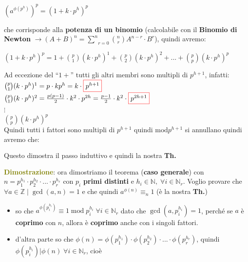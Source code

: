 \begin{flushleft}
\begin{boxA}
        {\centering
            $(a^{\phi(p^h)})^p = (1 + k \cdot p^h)^p$
        \par}
        che corrisponde alla \textbf{potenza di un binomio} (calcolabile con il \textbf{Binomio di Newton} $\rightarrow (A + B)^n = \underset{r=0}{\overset{n}{\sum}} \binom{n}{r} A^{n - r} \cdot B^r$), quindi avremo:

        {\centering
            $(1 + k \cdot p^h)^p = 1 + \binom{p}{1}(k \cdot p^h)^1 + \binom{p}{2}(k \cdot p^h)^2 + ... + \binom{p}{p}(k \cdot p^h)^p$
        \par}
        Ad eccezione del ``$1 +$'' tutti gli altri membri sono multipli di $p^{h + 1}$, infatti: \\
        $\binom{p}{1} (k \cdot p^h)^1 = p \cdot kp^h = k \cdot \fcolorbox{red}{white}{$p^{h + 1}$}$ \\
        $\binom{p}{1} (k \cdot p^h)^2 = \frac{p(p - 1)}{2} \cdot k^2 \cdot p^{2h} = \frac{p - 1}{2} \cdot k^2 \cdot \fcolorbox{red}{white}{$p^{2h + 1}$}$ \\
        $\vdots$ \\
        $\binom{p}{p} (k \cdot p^h)^p$ \\
        Quindi tutti i fattori sono multipli di $p^{h + 1}$ quindi $\text{mod} p^{h + 1}$ si annullano quindi avremo che:
        
        {\centering
        \par}
        Questo dimostra il passo induttivo e quindi la nostra \textbf{Th.}
    \end{boxA}
    \begin{boxA}
        \textcolor{olive}{\textbf{Dimostrazione}}: ora dimostriamo il teorema (\textbf{caso generale}) con $n = p_1^{h_1} \cdot p_2^{h_2} \cdot ... \cdot p_r^{h_r}$ con $p_i$ \textbf{primi distinti} e $h_i \in \mathbb{N}, \; \forall i \in \mathbb{N}_r$. Voglio provare che $\forall a \in \mathbb{Z} \; | \; \gcd (a, n) = 1$ e che quindi $a^{\phi(n)} \equiv_n 1$ (è la nostra \textbf{Th.})
        \begin{itemize}[nosep]
            \item so che $a^{\phi(p_i^{h_i})} \equiv 1 \; \text{mod} \; p_i^{h_i} \; \forall i \in \mathbb{N}_r$ dato che $\gcd (a, p_i^{h_i}) = 1$, perché se $a$ è \textbf{coprimo} con $n$, allora è \textbf{coprimo} anche con i singoli fattori.
            \item d'altra parte so che $\phi(n) = \phi(p_1^{h_1}) \cdot \phi(p_2^{h_2}) \cdot ... \cdot \phi(p_r^{h_r})$, quindi $\phi(p_i^{h_i})|\phi(n) \; \forall i \in \mathbb{N}_r$, cioè 
            

\end{itemize}
\end{boxA}
\end{flushleft}
